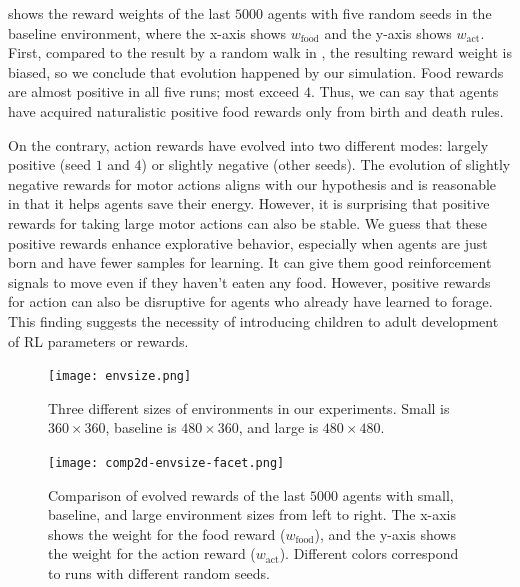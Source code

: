  shows the reward weights of the last $5000$ agents with five random seeds in the baseline environment, where the x-axis shows $w_{\mathrm{food}}$ and the y-axis shows $w_{\mathrm{act}}$. First, compared to the result by a random walk in , the resulting reward weight is biased, so we conclude that evolution happened by our simulation. Food rewards are almost positive in all five runs; most exceed $4$. Thus, we can say that agents have acquired naturalistic positive food rewards only from birth and death rules.

On the contrary, action rewards have evolved into two different modes: largely positive (seed $1$ and $4$) or slightly negative (other seeds). The evolution of slightly negative rewards for motor actions aligns with our hypothesis and is reasonable in that it helps agents save their energy. However, it is surprising that positive rewards for taking large motor actions can also be stable. We guess that these positive rewards enhance explorative behavior, especially when agents are just born and have fewer samples for learning. It can give them good reinforcement signals to move even if they haven't eaten any food. However, positive rewards for action can also be disruptive for agents who already have learned to forage. This finding suggests the necessity of introducing children to adult development of RL parameters or rewards.

\begin{figure}[t]
  \centering
  \texttt{[image: envsize.png]}
  \caption{
    Three different sizes of environments in our experiments. Small is $360\times360$, baseline is $480\times360$, and large is $480\times480$.
  }\label{figure:envsize}
\end{figure}

\begin{figure}[t]
  \centering
  \texttt{[image: comp2d-envsize-facet.png]}
  \caption{
    Comparison of evolved rewards of the last $5000$ agents with small, baseline, and large environment sizes from left to right.
    The x-axis shows the weight for the food reward ($w_{\mathrm{food}}$), and the y-axis shows the weight for the action reward ($w_{\mathrm{act}}$).
    Different colors correspond to runs with different random seeds.
  }\label{figure:result-envsize}
\end{figure}

